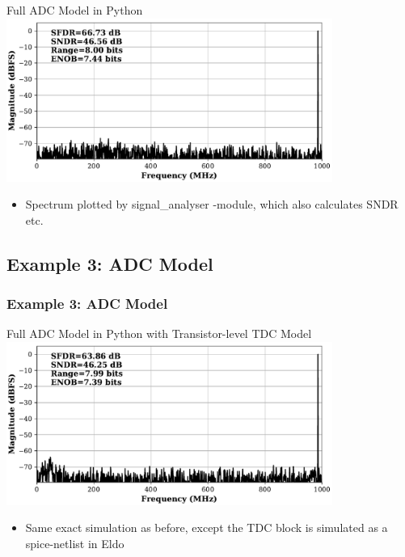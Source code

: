 \documentclass{sdkslides}
\begin{document}
\subsection*{\sectionname} 
\begin{frame}[c]
    \frametitle{\sectionname}
    \begin{center}
        Full ADC Model in Python
        \includegraphics[width=0.8\textwidth]{Pics/latido_fft_py}
    \end{center}
    \begin{itemize}
        \item Spectrum plotted by signal\_analyser -module, which also
            calculates SNDR etc.
    \end{itemize}
\end{frame}

\renewcommand{\sectionname}{Example 3: ADC Model}
\subsection*{\sectionname} 
\begin{frame}[c]
    \frametitle{\sectionname}
    \begin{center}
        Full ADC Model in Python with Transistor-level TDC Model
        \includegraphics[width=0.8\textwidth]{Pics/latido_fft_eldo}
    \end{center}
    \begin{itemize}
        \item Same exact simulation as before, except the TDC block is
            simulated as a spice-netlist in Eldo
    \end{itemize}
\end{frame}
\end{document}

